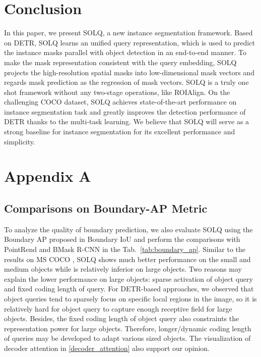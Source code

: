 \documentclass{article}
\begin{document}
\section{Conclusion}
In this paper, we present SOLQ, a new instance segmentation framework. Based on DETR, SOLQ learns an unified query representation, which is used to predict the instance masks parallel with object detection in an end-to-end manner. To make the mask representation consistent with the query embedding, SOLQ projects the high-resolution spatial masks into low-dimensional mask vectors and regards mask prediction as the regression of mask vectors. SOLQ is a truly one shot framework without any two-stage operations, like ROIAlign. On the challenging COCO dataset, SOLQ achieves state-of-the-art performance on instance segmentation task and greatly improves the detection performance of DETR thanks to the multi-task learning. We believe that SOLQ will serve as a strong baseline for instance segmentation for its excellent performance and simplicity.


{\small


}
\clearpage
\appendix

\section{Appendix A}

\subsection{Comparisons on Boundary-AP Metric}
\label{boundary_results}
To analyze the quality of boundary prediction, we also evaluate SOLQ using the Boundary AP proposed in Boundary IoU \cite{cheng2021boundaryiou} and perform the comparisons with PointRend \cite{kirillov2020pointrend} and BMask R-CNN \cite{cheng2020bmaskrcnn} in the Tab.~\ref{tab:boundary_ap}. Similar to the results on MS COCO \cite{lin2014microsoft}, SOLQ shows much better performance on the small and medium objects while is relatively inferior on large objects. Two reasons may explain the lower performance on large objects: sparse activation of object query and fixed coding length of query. For DETR-based approaches, we observed that object queries tend to sparsely focus on specific local regions in the image, so it is relatively hard for object query to capture enough receptive field for large objects. Besides, the fixed coding length of object query also constraints the representation power for large objects. Therefore, longer/dynamic coding length of queries may be developed to adapt various sized objects. The visualization of decoder attention in \ref{decoder_attention} also support our opinion.\vspace{-0.1cm}
\end{document}
